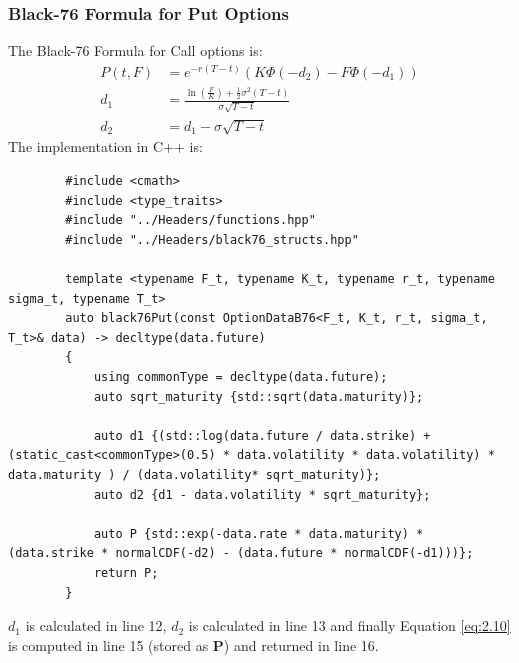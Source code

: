 \documentclass[12pt]{article}
\numberwithin{equation}{section}
\begin{document}
\subsubsection{Black-76 Formula for Put Options}
The Black-76 Formula for Call options is:
\begin{equation}
\begin{aligned}
	P(t,F) &= e^{-r(T-t)}(K\Phi(-d_2) - F\Phi(-d_1) ) \\
	d_1 &= \frac{\ln(\frac{F}{K}) +\frac{1}{2}\sigma^2(T-t)}{\sigma \sqrt{T-t}} \\
	d_2 &= d_1 - \sigma \sqrt{T-t} 
\label{eq:2.10}
\end{aligned} 
\end{equation} \cite{black1976CommodityContracts}
The implementation in C++ is:
\begin{listing}[ht]
	\begin{verbatim}
		#include <cmath>
		#include <type_traits>
		#include "../Headers/functions.hpp"
		#include "../Headers/black76_structs.hpp"
		
		template <typename F_t, typename K_t, typename r_t, typename sigma_t, typename T_t>
		auto black76Put(const OptionDataB76<F_t, K_t, r_t, sigma_t, T_t>& data) -> decltype(data.future)
		{
			using commonType = decltype(data.future);
			auto sqrt_maturity {std::sqrt(data.maturity)};
			
			auto d1 {(std::log(data.future / data.strike) + (static_cast<commonType>(0.5) * data.volatility * data.volatility) * data.maturity ) / (data.volatility* sqrt_maturity)};
			auto d2 {d1 - data.volatility * sqrt_maturity};
			
			auto P {std::exp(-data.rate * data.maturity) * (data.strike * normalCDF(-d2) - (data.future * normalCDF(-d1)))};
			return P;
		}
	\end{verbatim}
	\caption{Black-76 Call using Closed Form Solution}
	\label{lst:b76putcF}
\end{listing}
\newline
$d_1$ is calculated in line 12, $d_2$ is calculated in line 13 and finally Equation \ref{eq:2.10} is computed in line 15 (stored as \textbf{P}) and returned in line 16.
\newpage
\end{document}
